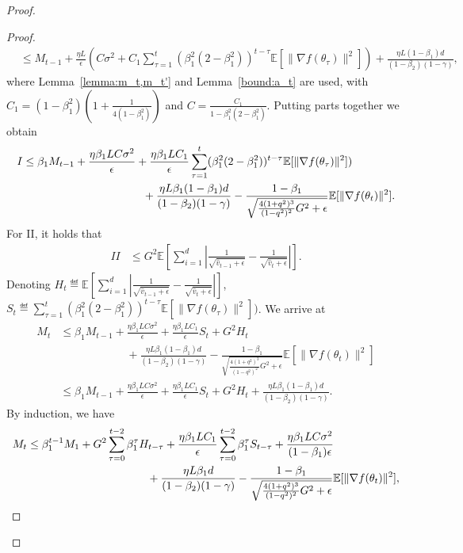 \documentclass[11pt]{article}
\begin{document}
\begin{proof}
\begin{proof}
\begin{align}
    &\leq M_{t-1}+\frac{\eta L}{\epsilon}(C\sigma^2+C_1\sum_{\tau=1}^t (\beta_1^2(2-\beta_1^2))^{t-\tau}\mathbb E[\|\nabla f(\theta_\tau)\|^2])+\frac{\eta L(1-\beta_1)d}{(1-\beta_2)(1-\gamma)},
\end{align}
where Lemma~\ref{lemma:m_t,m_t'} and Lemma~\ref{bound:a_t} are used, with $C_1=(1-\beta_1^2)(1+\frac{1}{4(1-\beta_1^2)})$ and $C=\frac{C_1}{1-\beta_1^2(2-\beta_1^2)}$. Putting parts together we obtain
\begin{align*}
    I&\leq \beta_1 M_{t-1}+\frac{\eta \beta_1 LC\sigma^2}{\epsilon}+\frac{\eta \beta_1 LC_1}{\epsilon} \sum_{\tau=1}^t (\beta_1^2(2-\beta_1^2))^{t-\tau}\mathbb E[\|\nabla f(\theta_\tau)\|^2])\\
    &\hspace{1.5in} +\frac{\eta L\beta_1(1-\beta_1)d}{(1-\beta_2)(1-\gamma)}-\frac{1-\beta_1}{\sqrt{\frac{4(1+q^2)^3}{(1-q^2)^2}G^2+\epsilon}}\mathbb E[\|\nabla f(\theta_t)\|^2].
\end{align*}
For II, it holds that
\begin{align*}
    II&\leq G^2 \mathbb E[\sum_{i=1}^d |\frac{1}{\sqrt{\hat v_{t-1}+\epsilon}}-\frac{1}{\sqrt{\hat v_t+\epsilon}}| ].
\end{align*}
Denoting $H_t\eqdef \mathbb E[\sum_{i=1}^d |\frac{1}{\sqrt{\hat v_{t-1}+\epsilon}}-\frac{1}{\sqrt{\hat v_t+\epsilon}}| ]$, $S_t\eqdef \sum_{\tau=1}^t (\beta_1^2(2-\beta_1^2))^{t-\tau}\mathbb E[\|\nabla f(\theta_\tau)\|^2])$. We arrive at
\begin{align*}
    M_t&\leq \beta_1 M_{t-1}+\frac{\eta \beta_1 LC\sigma^2}{\epsilon}+\frac{\eta \beta_1 LC_1}{\epsilon} S_t+G^2 H_t\\
    &\hspace{1in} +\frac{\eta L\beta_1(1-\beta_1)d}{(1-\beta_2)(1-\gamma)}-\frac{1-\beta_1}{\sqrt{\frac{4(1+q^2)^3}{(1-q^2)^2}G^2+\epsilon}}\mathbb E[\|\nabla f(\theta_t)\|^2]\\
    &\leq \beta_1 M_{t-1}+\frac{\eta \beta_1 LC\sigma^2}{\epsilon}+\frac{\eta \beta_1 LC_1}{\epsilon} S_t+G^2 H_t+\frac{\eta L\beta_1(1-\beta_1)d}{(1-\beta_2)(1-\gamma)}.
\end{align*}
By induction, we have
\begin{align*}
    M_t&\leq \beta_1^{t-1} M_1+G^2 \sum_{\tau=0}^{t-2} \beta_1^\tau H_{t-\tau}+\frac{\eta \beta_1 LC_1}{\epsilon} \sum_{\tau=0}^{t-2}\beta_1^\tau S_{t-\tau}+ \frac{\eta \beta_1 LC\sigma^2}{(1-\beta_1)\epsilon}\\
    &\hspace{1.5in} +\frac{\eta L\beta_1 d}{(1-\beta_2)(1-\gamma)}-\frac{1-\beta_1}{\sqrt{\frac{4(1+q^2)^3}{(1-q^2)^2}G^2+\epsilon}}\mathbb E[\|\nabla f(\theta_t)\|^2],

\end{align*}
\end{proof}
\end{proof}
\end{document}
